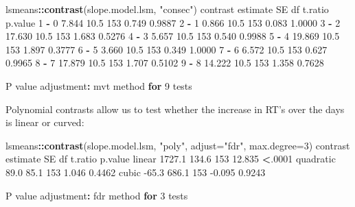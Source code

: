 \documentclass[]{article}
\newenvironment{Shaded}{\begin{snugshade}}{\end{snugshade}}
\newcommand{\ControlFlowTok}[1]{\textcolor[rgb]{0.13,0.29,0.53}{\textbf{#1}}}
\newcommand{\DataTypeTok}[1]{\textcolor[rgb]{0.13,0.29,0.53}{#1}}
\newcommand{\DecValTok}[1]{\textcolor[rgb]{0.00,0.00,0.81}{#1}}
\newcommand{\FloatTok}[1]{\textcolor[rgb]{0.00,0.00,0.81}{#1}}
\newcommand{\KeywordTok}[1]{\textcolor[rgb]{0.13,0.29,0.53}{\textbf{#1}}}
\newcommand{\NormalTok}[1]{#1}
\newcommand{\OperatorTok}[1]{\textcolor[rgb]{0.81,0.36,0.00}{\textbf{#1}}}
\newcommand{\StringTok}[1]{\textcolor[rgb]{0.31,0.60,0.02}{#1}}
\begin{document}
\begin{Shaded}
\begin{Highlighting}[]
\NormalTok{lsmeans}\OperatorTok{::}\KeywordTok{contrast}\NormalTok{(slope.model.lsm, }\StringTok{"consec"}\NormalTok{)}
\NormalTok{ contrast estimate   SE  df t.ratio p.value}
 \DecValTok{1} \OperatorTok{-}\StringTok{ }\DecValTok{0}       \FloatTok{7.844} \FloatTok{10.5} \DecValTok{153} \FloatTok{0.749}   \FloatTok{0.9887} 
 \DecValTok{2} \OperatorTok{-}\StringTok{ }\DecValTok{1}       \FloatTok{0.866} \FloatTok{10.5} \DecValTok{153} \FloatTok{0.083}   \FloatTok{1.0000} 
 \DecValTok{3} \OperatorTok{-}\StringTok{ }\DecValTok{2}      \FloatTok{17.630} \FloatTok{10.5} \DecValTok{153} \FloatTok{1.683}   \FloatTok{0.5276} 
 \DecValTok{4} \OperatorTok{-}\StringTok{ }\DecValTok{3}       \FloatTok{5.657} \FloatTok{10.5} \DecValTok{153} \FloatTok{0.540}   \FloatTok{0.9988} 
 \DecValTok{5} \OperatorTok{-}\StringTok{ }\DecValTok{4}      \FloatTok{19.869} \FloatTok{10.5} \DecValTok{153} \FloatTok{1.897}   \FloatTok{0.3777} 
 \DecValTok{6} \OperatorTok{-}\StringTok{ }\DecValTok{5}       \FloatTok{3.660} \FloatTok{10.5} \DecValTok{153} \FloatTok{0.349}   \FloatTok{1.0000} 
 \DecValTok{7} \OperatorTok{-}\StringTok{ }\DecValTok{6}       \FloatTok{6.572} \FloatTok{10.5} \DecValTok{153} \FloatTok{0.627}   \FloatTok{0.9965} 
 \DecValTok{8} \OperatorTok{-}\StringTok{ }\DecValTok{7}      \FloatTok{17.879} \FloatTok{10.5} \DecValTok{153} \FloatTok{1.707}   \FloatTok{0.5102} 
 \DecValTok{9} \OperatorTok{-}\StringTok{ }\DecValTok{8}      \FloatTok{14.222} \FloatTok{10.5} \DecValTok{153} \FloatTok{1.358}   \FloatTok{0.7628} 

\NormalTok{P value adjustment}\OperatorTok{:}\StringTok{ }\NormalTok{mvt method }\ControlFlowTok{for} \DecValTok{9}\NormalTok{ tests }
\end{Highlighting}
\end{Shaded}

Polynomial contrasts allow us to test whether the increase in RT's over the days
is linear or curved:

\begin{Shaded}
\begin{Highlighting}[]
\NormalTok{lsmeans}\OperatorTok{::}\KeywordTok{contrast}\NormalTok{(slope.model.lsm, }\StringTok{"poly"}\NormalTok{, }\DataTypeTok{adjust=}\StringTok{"fdr"}\NormalTok{, }\DataTypeTok{max.degree=}\DecValTok{3}\NormalTok{)}
\NormalTok{ contrast  estimate    SE  df t.ratio p.value}
\NormalTok{ linear      }\FloatTok{1727.1} \FloatTok{134.6} \DecValTok{153} \FloatTok{12.835}  \OperatorTok{<}\NormalTok{.}\DecValTok{0001} 
\NormalTok{ quadratic     }\FloatTok{89.0}  \FloatTok{85.1} \DecValTok{153}  \FloatTok{1.046}  \FloatTok{0.4462} 
\NormalTok{ cubic        }\FloatTok{-65.3} \FloatTok{686.1} \DecValTok{153} \FloatTok{-0.095}  \FloatTok{0.9243} 

\NormalTok{P value adjustment}\OperatorTok{:}\StringTok{ }\NormalTok{fdr method }\ControlFlowTok{for} \DecValTok{3}\NormalTok{ tests }
\end{Highlighting}
\end{Shaded}
\end{document}
